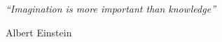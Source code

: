 \thispagestyle{empty}  %
\null\vfill

\textit{``Imagination is more important than knowledge''}

\begin{flushright}
Albert Einstein
\end{flushright}

\vfill\vfill\vfill\vfill\vfill\vfill\null